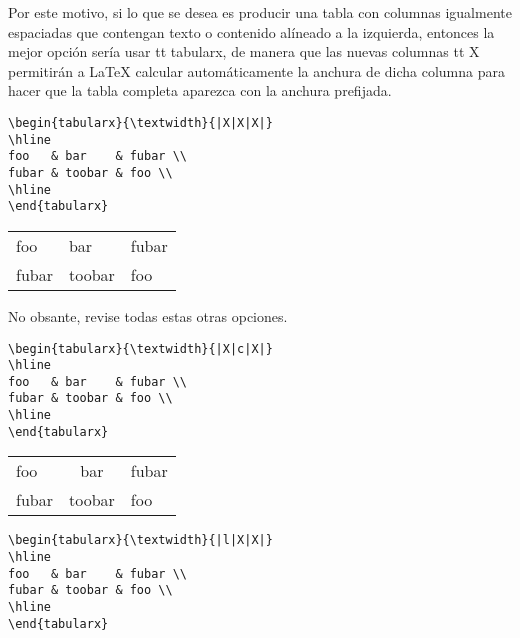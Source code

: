 \documentclass{article}
\begin{document}
Por este motivo, si lo que se desea es producir una tabla con columnas igualmente espaciadas que contengan texto o contenido alíneado a la izquierda, entonces la mejor opción sería usar {tt tabularx}, de manera que las nuevas columnas {tt X} permitirán a \LaTeX{} calcular automáticamente la anchura de dicha columna para hacer que la tabla completa aparezca con la anchura prefijada.

\vspace{1cm}

\begin{verbatim}
\begin{tabularx}{\textwidth}{|X|X|X|}
\hline
foo   & bar    & fubar \\
fubar & toobar & foo \\
\hline
\end{tabularx}
\end{verbatim}

\begin{tabularx}{\textwidth}{|X|X|X|}
	\hline
	foo   & bar    & fubar \\
	fubar & toobar & foo \\
	\hline
\end{tabularx}

\vspace{1.5cm}

No obsante, revise todas estas otras opciones.

\vspace{1cm}

\begin{verbatim}
\begin{tabularx}{\textwidth}{|X|c|X|}
\hline
foo   & bar    & fubar \\
fubar & toobar & foo \\
\hline
\end{tabularx}
\end{verbatim}

\begin{tabularx}{\textwidth}{|X|c|X|}
	\hline
	foo   & bar    & fubar \\
	fubar & toobar & foo \\
	\hline
\end{tabularx}

\vspace{1cm}

\begin{verbatim}
\begin{tabularx}{\textwidth}{|l|X|X|}
\hline
foo   & bar    & fubar \\
fubar & toobar & foo \\
\hline
\end{tabularx}
\end{verbatim}
\end{document}
